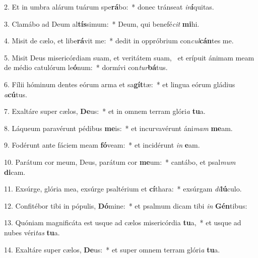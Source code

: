 2. Et in umbra alárum tuárum spe\textbf{rá}bo:~*  donec tránseat \textit{in}\textbf{í}quitas.\

3. Clamábo ad Deum al\textbf{tís}simum:~*  Deum, qui benefé\textit{cit} \textbf{mi}hi.\

4. Misit de cælo, et libe\textbf{rá}vit me:~*  dedit in oppróbrium con\textit{cul}\textbf{cán}tes me.\

5. Misit Deus misericórdiam suam, et veritátem suam, \dag\  et erípuit ánimam meam de médio catulórum le\textbf{ó}num:~*  dormívi con\textit{tur}\textbf{bá}tus.\

6. Fílii hóminum dentes eórum arma et sa\textbf{gít}tæ:~*  et lingua eórum gládius \textit{a}\textbf{cú}tus.\

7. Exaltáre super cælos, \textbf{De}us:~*  et in omnem terram glóri\textit{a} \textbf{tu}a.\

8. Láqueum paravérunt pédibus \textbf{me}is:~*  et incurvavérunt áni\textit{mam} \textbf{me}am.\

9. Fodérunt ante fáciem meam \textbf{fó}veam:~*  et incidérunt \textit{in} \textbf{e}am.\

10. Parátum cor meum, Deus, parátum cor \textbf{me}um:~*  cantábo, et psal\textit{mum} \textbf{di}cam.\

11. Exsúrge, glória mea, exsúrge psaltérium et \textbf{cí}thara:~*  exsúrgam \textit{di}\textbf{lú}culo.\

12. Confitébor tibi in pópulis, \textbf{Dó}mine:~*  et psalmum dicam tibi \textit{in} \textbf{Gén}tibus:\

13. Quóniam magnificáta est usque ad cælos misericórdia \textbf{tu}a,~*  et usque ad nubes véri\textit{tas} \textbf{tu}a.\

14. Exaltáre super cælos, \textbf{De}us:~*  et super omnem terram glóri\textit{a} \textbf{tu}a.\

